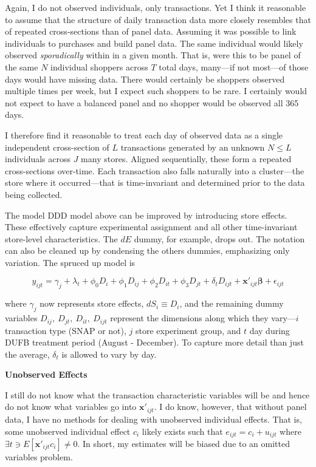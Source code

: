 \documentclass[12pt,letterpaperpaper,]{book}
\begin{document}
Again, I do not observed individuals, only transactions. Yet I think it
reasonable to assume that the structure of daily transaction data more
closely resembles that of repeated cross-sections than of panel data.
Assuming it was possible to link individuals to purchases and build
panel data. The same individual would likely observed
\emph{sporadically} within in a given month. That is, were this to be
panel of the same \(N\) individual shoppers across \(T\) total days,
many---if not most---of those days would have missing data. There would
certainly be shoppers observed multiple times per week, but I expect
such shoppers to be rare. I certainly would not expect to have a
balanced panel and no shopper would be observed all 365 days.

I therefore find it reasonable to treat each day of observed data as a
single independent cross-section of \(L\) transactions generated by an
unknown \(N \le L\) individuals across \(J\) many stores. Aligned
sequentially, these form a repeated cross-sections over-time. Each
transaction also falls naturally into a cluster---the store where it
occurred---that is time-invariant and determined prior to the data being
collected.

The model DDD model above can be improved by introducing store effects.
These effectively capture experimental assignment and all other
time-invariant store-level characteristics. The \(dE\) dummy, for
example, drops out. The notation can also be cleaned up by condensing
the others dummies, emphasizing only variation. The spruced up model is

\begin{equation}
y_{ijt} = \gamma_j + \lambda_t + \phi_0 D_i + \phi_1 D_{ij} + \phi_2 D_{it}+ \phi_3 D_{jt} + \delta_t D_{ijt} + \bm{x'}_{ijt} \bm{\beta} + \epsilon_{ijt}
\label{eq:ddd}
\end{equation}

where \(\gamma_j\) now represents store effects, \(dS_i \equiv D_i\),
and the remaining dummy variables \(D_{ij},~D_{jt},~D_{it},~D_{ijt}\)
represent the dimensions along which they vary---\(i\) transaction type
(SNAP or not), \(j\) store experiment group, and \(t\) day during DUFB
treatment period (August - December). To capture more detail than just
the average, \(\delta_t\) is allowed to vary by day.

\textbf{Unobserved Effects}

I still do not know what the transaction characteristic variables will
be and hence do not know what variables go into \(\bm{x'}_{ijt}\). I do
know, however, that without panel data, I have no methods for dealing
with unobserved individual effects. That is, some unobserved individual
effect \(c_i\) likely exists such that \(e_{ijt} = c_i + u_{ijt}\) where
\(\exists t \ni E[\bm{x'}_{ijt}c_i] \ne 0\). In short, my estimates will
be biased due to an omitted variables problem.
\end{document}
